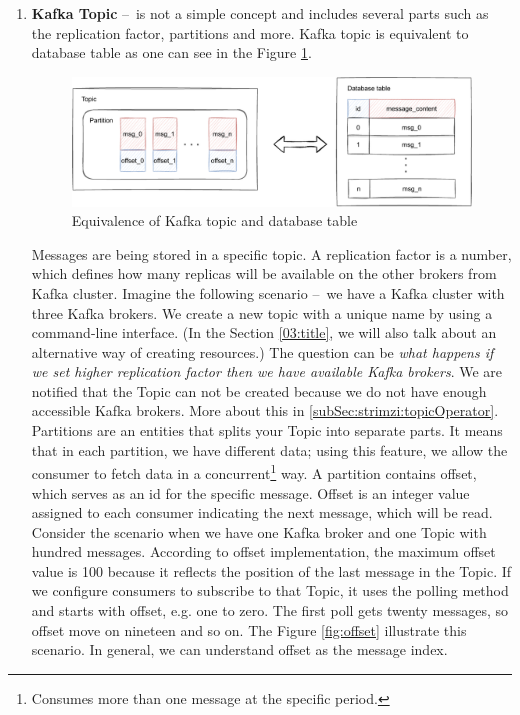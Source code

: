 \begin{enumerate}
    \item \textbf{Kafka Topic} \---\ is not a simple concept and includes several parts such as the replication factor, partitions and more. Kafka topic is equivalent to database table as one can see in the Figure \ref{fig:topicAndDatabaseTable}.
     \begin{figure}[!ht]
    \centering
    \includegraphics[scale=0.80]{obrazky-figures/02-preliminaries/02-kafka/03-database-relation.pdf}
    \caption{Equivalence of Kafka topic and database table}
    \label{fig:topicAndDatabaseTable}
    \end{figure}
    

    Messages are being stored in a specific topic. A replication factor is a number, which defines how many replicas will be available on the other brokers from Kafka cluster. Imagine the following scenario \---\ we have a Kafka cluster with three Kafka brokers. We create a new topic with a unique name by using a command-line interface. (In the Section \ref{03:title}, we will also talk about an alternative way of creating resources.) The question can be \emph{what happens if we set higher replication factor then we have available Kafka brokers}. We are notified that the Topic can not be created because we do not have enough accessible Kafka brokers. More about this in \ref{subSec:strimzi:topicOperator}. Partitions are an entities that splits your Topic into separate parts. It means that in each partition, we have different data; using this feature, we allow the consumer to fetch data in a concurrent\footnote{Consumes more than one message at the specific period.} way. A partition contains offset, which serves as an id for the specific message. Offset is an integer value assigned to each consumer indicating the next message, which will be read. Consider the scenario when we have one Kafka broker and one Topic with hundred messages. According to offset implementation, the maximum offset value is 100 because it reflects the position of the last message in the Topic. If we configure consumers to subscribe to that Topic, it uses the polling method and starts with offset, e.g. one to zero. The first poll gets twenty messages, so offset move on nineteen and so on. The Figure  \ref{fig:offset} illustrate this scenario. In general, we can understand offset as the message index.
    

\end{enumerate}
